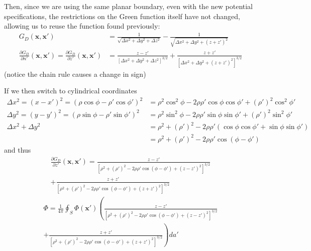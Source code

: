\documentclass{article}
\begin{document}
Then, since we are using the same planar boundary, even with the new potential specifications, the restrictions on the Green function itself have not changed, allowing us to reuse the function found previously:
\begin{align*}
G_{D}(\mathbf{x},\mathbf{x'}) &= \frac{1}{\sqrt{\Delta x^{2}+\Delta y^{2}+\Delta z^{2}}} - \frac{1}{\sqrt{\Delta x^{2}+\Delta y^{2}+(z+z')^{2}}}\\
\frac{\partial G_{D}}{\partial n'}(\mathbf{x},\mathbf{x'}) = \frac{\partial G_{D}}{\partial z'}(\mathbf{x},\mathbf{x'}) &= \frac{z-z'}{[\Delta x^{2}+\Delta y^{2}+\Delta z^{2}]^{3/2}} + \frac{z+z'}{[\Delta x^{2}+\Delta y^{2}+(z+z')^{2}]^{3/2}}
\end{align*}
(notice the chain rule causes a change in sign) 

If we then switch to cylindrical coordinates
\begin{align*}
\Delta x^{2} = (x-x')^{2} = (\rho\cos\phi - \rho'\cos\phi')^{2} &= \rho^{2}\cos^{2}\phi - 2\rho\rho'\cos\phi\cos\phi' + (\rho')^{2}\cos^{2}\phi'\\
\Delta y^{2} = (y-y')^{2} = (\rho\sin\phi - \rho'\sin\phi')^{2} &= \rho^{2}\sin^{2}\phi - 2\rho\rho'\sin\phi\sin\phi' + (\rho')^{2}\sin^{2}\phi'\\
\Delta x^{2} + \Delta y^{2} &= \rho^{2} + (\rho')^{2} - 2\rho\rho'(\cos\phi\cos\phi' + \sin\phi\sin\phi')\\
&= \rho^{2} + (\rho')^{2} - 2\rho\rho'\cos(\phi-\phi')
\end{align*}
and thus
\begin{multline*}
\frac{\partial G_{D}}{\partial z'}(\mathbf{x},\mathbf{x'}) = \frac{z-z'}{[\rho^{2} + (\rho')^{2} - 2\rho\rho'\cos(\phi-\phi') + (z-z')^{2}]^{3/2}}\\ + \frac{z+z'}{[\rho^{2} + (\rho')^{2} - 2\rho\rho'\cos(\phi-\phi') + (z+z')^{2}]^{3/2}}
\end{multline*}
\begin{multline*}
\Phi = \frac{1}{4\pi} \oint_{S} \Phi(\mathbf{x'}) \left( \frac{z-z'}{[\rho^{2} + (\rho')^{2} - 2\rho\rho'\cos(\phi-\phi') + (z-z')^{2}]^{3/2}} \right. \\ \left. + \frac{z+z'}{[\rho^{2} + (\rho')^{2} - 2\rho\rho'\cos(\phi-\phi') + (z+z')^{2}]^{3/2}} \right) da'
\end{multline*}
\end{document}
